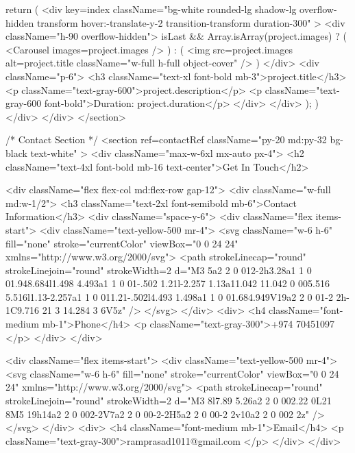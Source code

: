 {{{            return (
              <div
                key={index}
                className="bg-white rounded-lg shadow-lg overflow-hidden transform hover:-translate-y-2 transition-transform duration-300"
              >
                <div className="h-90 overflow-hidden">
                  {isLast && Array.isArray(project.images) ? (
                    <Carousel images={project.images} />
                  ) : (
                    <img
                      src={project.images}
                      alt={project.title}
                      className="w-full h-full object-cover"
                    />
                  )}
                </div>
                <div className="p-6">
                  <h3 className="text-xl font-bold mb-3">{project.title}</h3>
                  <p className="text-gray-600">{project.description}</p>
                  <p className="text-gray-600 font-bold">Duration: {project.duration}</p>
                </div>
              </div>
            );
          })}
          </div>
        </div>
      </section>

      {/* Contact Section */}
      <section
        ref={contactRef}
        className="py-20 md:py-32 bg-black text-white"
      >
        <div className="max-w-6xl mx-auto px-4">
          <h2 className="text-4xl font-bold mb-16 text-center">Get In Touch</h2>
          
          <div className="flex flex-col md:flex-row gap-12">
            <div className="w-full md:w-1/2">
              <h3 className="text-2xl font-semibold mb-6">Contact Information</h3>
              <div className="space-y-6">
                <div className="flex items-start">
                  <div className="text-yellow-500 mr-4">
                    <svg className="w-6 h-6" fill="none" stroke="currentColor" viewBox="0 0 24 24" xmlns="http://www.w3.org/2000/svg">
                      <path strokeLinecap="round" strokeLinejoin="round" strokeWidth={2} d="M3 5a2 2 0 012-2h3.28a1 1 0 01.948.684l1.498 4.493a1 1 0 01-.502 1.21l-2.257 1.13a11.042 11.042 0 005.516 5.516l1.13-2.257a1 1 0 011.21-.502l4.493 1.498a1 1 0 01.684.949V19a2 2 0 01-2 2h-1C9.716 21 3 14.284 3 6V5z" />
                    </svg>
                  </div>
                  <div>
                    <h4 className="font-medium mb-1">Phone</h4>
                    <p className="text-gray-300">+974 70451097 </p>
                  </div>
                </div>
                
                <div className="flex items-start">
                  <div className="text-yellow-500 mr-4">
                    <svg className="w-6 h-6" fill="none" stroke="currentColor" viewBox="0 0 24 24" xmlns="http://www.w3.org/2000/svg">
                      <path strokeLinecap="round" strokeLinejoin="round" strokeWidth={2} d="M3 8l7.89 5.26a2 2 0 002.22 0L21 8M5 19h14a2 2 0 002-2V7a2 2 0 00-2-2H5a2 2 0 00-2 2v10a2 2 0 002 2z" />
                    </svg>
                  </div>
                  <div>
                    <h4 className="font-medium mb-1">Email</h4>
                    <p className="text-gray-300">ramprasad1011@gmail.com </p>
                  </div>
                </div>
                
}
